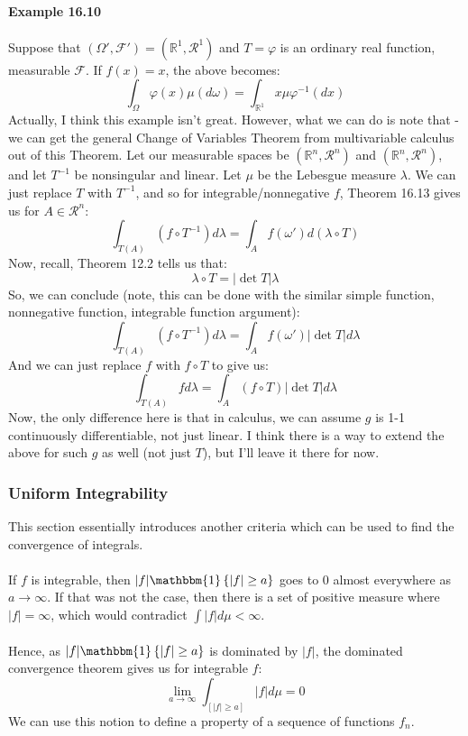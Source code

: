 \documentclass[12pt,a4paper]{article}
\newcommand{\1}[1]{\mathbbm{1}\left\{ #1 \right\}}
\newcommand{\R}{\mathbb{R}}
\newcommand{\fcal}{\mathcal{F}}
\newcommand{\rcal}{\mathcal{R}}
\begin{document}
\paragraph{Example 16.10} Suppose that $(\Omega', \fcal') = (\R^1, \rcal^1)$ and $T = \varphi$ is an ordinary real function, measurable $\fcal$. If $f(x) = x$, the above becomes:
$$
	\int_\Omega \varphi(x) \mu(d\omega) = \int_{\R^1} x\mu\varphi^{-1}(dx)
$$
Actually, I think this example isn't great. However, what we can do is note that - we can get the general Change of Variables Theorem from multivariable calculus out of this Theorem. Let our measurable spaces be $(\R^n, \rcal^n)$ and $(\R^n, \rcal^n)$, and let $T^{-1}$ be nonsingular and linear. Let $\mu$ be the Lebesgue measure $\lambda$.  We can just replace $T$ with $T^{-1}$, and so for integrable/nonnegative $f$, Theorem 16.13 gives us for $A \in \rcal^n$:
$$
	\int_{T(A)} (f \circ T^{-1}) d\lambda = \int_A f(\omega') d(\lambda \circ T)
$$
Now, recall, Theorem 12.2 tells us that:
$$
	\lambda \circ T = |\det T|\lambda
$$
So, we can conclude (note, this can be done with the similar simple function, nonnegative function, integrable function argument):
$$
	\int_{T(A)} (f \circ T^{-1}) d\lambda = \int_A f(\omega') |\det T| d\lambda
$$
And we can just replace $f$ with $f \circ T$ to give us:
$$
	\int_{T(A)} f d\lambda = \int_A (f \circ T) |\det T| d\lambda
$$
Now, the only difference here is that in calculus, we can assume $g$ is 1-1 continuously differentiable, not just linear. I think there is a way to extend the above for such $g$ as well (not just $T$), but I'll leave it there for now.

\subsubsection{Uniform Integrability}
This section essentially introduces another criteria which can be used to find the convergence of integrals. \\\\
If $f$ is integrable, then $|f|\1{|f| \geq a}$ goes to $0$ almost everywhere as $a \to \infty$. If that was not the case, then there is a set of positive measure where $|f| = \infty$, which would contradict $\int |f| d\mu < \infty$.
\\\\
Hence, as $|f|\1{|f| \geq a}$ is dominated by $|f|$, the dominated convergence theorem gives us for integrable $f$:
$$
	\lim_{a \to \infty} \int_{[|f| \geq a]} |f| d\mu = 0
$$
We can use this notion to define a property of a sequence of functions $f_n$.
\end{document}
